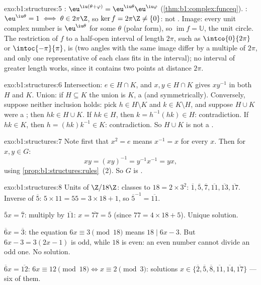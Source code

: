 \begin{solution}{exo:b1:structures:5}
: $\eu^{\iu(\theta + \varphi)} =
\eu^{\iu\theta}\eu^{\iu\varphi}$ (\cref{thm:b1:complex:funceq}).
: $\eu^{\iu\theta} = 1 \iff \theta \in 2\pi\Z$, so $\ker f =
2\pi\Z \neq \{0\}$: not . Image: every unit complex number is
$\eu^{\iu\theta}$ for some $\theta$ (polar form), so
$\operatorname{im} f = \mathbb{U}$, the unit circle. The restriction
of $f$ to a half-open interval of length $2\pi$, such as
$\intco{0}{2\pi}$ or $\intoc{-\pi}{\pi}$, is  (two angles
with the same image differ by a multiple of $2\pi$, and only one
representative of each class fits in the interval); no interval of
greater length works, since it contains two points at distance
$2\pi$.
\end{solution}

\begin{solution}{exo:b1:structures:6}
Intersection: $e \in H \cap K$, and $x, y \in H \cap K$ gives
$xy^{-1}$ in both $H$ and $K$. Union: if $H \subseteq K$ the union is
$K$, a  (and symmetrically). Conversely, suppose neither
inclusion holds: pick $h \in H \setminus K$ and $k \in K \setminus
H$, and suppose $H \cup K$ were a ; then $hk \in H \cup K$.
If $hk \in H$, then $k = h^{-1}(hk) \in H$: contradiction. If $hk \in
K$, then $h = (hk)k^{-1} \in K$: contradiction. So $H \cup K$ is not
a .
\end{solution}

\begin{solution}{exo:b1:structures:7}
Note first that $x^2 = e$ means $x^{-1} = x$ for every $x$. Then for
$x, y \in G$:
\[
xy = (xy)^{-1} = y^{-1} x^{-1} = yx ,
\]
using \cref{prop:b1:structures:rules}~(2). So $G$ is .
\end{solution}

\begin{solution}{exo:b1:structures:8}
Units of $\Z/18\Z$: classes  to $18 = 2 \times 3^2$:
$\overline 1, \overline 5, \overline 7, \overline{11}, \overline{13},
\overline{17}$. Inverse of $\overline 5$: $5 \times 11 = 55 = 3\times
18 + 1$, so $\overline 5^{-1} = \overline{11}$.

$\overline 5 x = \overline 7$: multiply by $\overline{11}$: $x =
\overline{77} = \overline 5$ (since $77 = 4\times 18 + 5$). Unique
solution.

$\overline 6 x = \overline 3$: the equation $6x \equiv 3 \pmod{18}$
means $18 \mid 6x - 3$. But $6x - 3 = 3(2x - 1)$ is odd, while $18$
is even: an even number cannot divide an odd one. No solution.

$\overline 6 x = \overline{12}$: $6x \equiv 12 \pmod{18} \iff x
\equiv 2 \pmod 3$: solutions $x \in \{\overline 2, \overline 5,
\overline 8, \overline{11}, \overline{14}, \overline{17}\}$ --- six
of them.
\end{solution}

